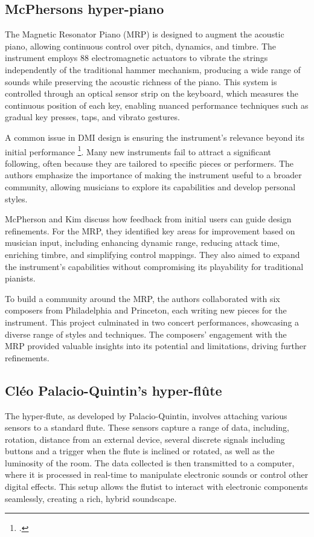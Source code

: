 \documentclass[12pt,twoside,maitrise]{dms_ks}
\theoremstyle{definition}
\begin{document}
{\subsection{McPhersons hyper-piano}

The Magnetic Resonator Piano (MRP) is designed to augment the acoustic piano, allowing continuous control over pitch, dynamics, and timbre. 
The instrument employs 88 electromagnetic actuators to vibrate the strings independently of the traditional hammer mechanism, producing a wide range of sounds while preserving the acoustic richness of the piano. 
This system is controlled through an optical sensor strip on the keyboard, which measures the continuous position of each key, enabling nuanced performance techniques such as gradual key presses, taps, and vibrato gestures.

A common issue in DMI design is ensuring the instrument's relevance beyond its initial performance \footcite{mcpherson_problem_2012}. 
Many new instruments fail to attract a significant following, often because they are tailored to specific pieces or performers. 
The authors emphasize the importance of making the instrument useful to a broader community, allowing musicians to explore its capabilities and develop personal styles.

McPherson and Kim discuss how feedback from initial users can guide design refinements. 
For the MRP, they identified key areas for improvement based on musician input, including enhancing dynamic range, reducing attack time, enriching timbre, and simplifying control mappings. 
They also aimed to expand the instrument's capabilities without compromising its playability for traditional pianists.

To build a community around the MRP, the authors collaborated with six composers from Philadelphia and Princeton, each writing new pieces for the instrument. 
This project culminated in two concert performances, showcasing a diverse range of styles and techniques. 
The composers' engagement with the MRP provided valuable insights into its potential and limitations, driving further refinements.

\subsection{Cléo Palacio-Quintin's hyper-flûte}

The hyper-flute, as developed by Palacio-Quintin, involves attaching various sensors to a standard flute. 
These sensors capture a range of data, including, rotation, distance from an external device, several discrete signals including buttons and a trigger when the flute is inclined or rotated, as well as the luminosity of the room. 
The data collected is then transmitted to a computer, where it is processed in real-time to manipulate electronic sounds or control other digital effects. 
This setup allows the flutist to interact with electronic components seamlessly, creating a rich, hybrid soundscape.

}
\end{document}

